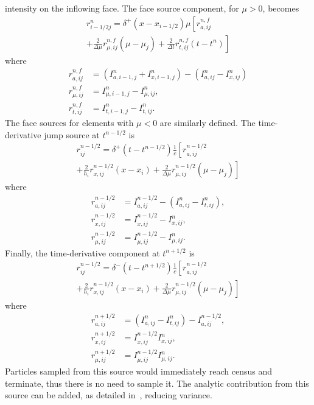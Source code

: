\documentclass{anstrans}
\begin{document}
intensity on the inflowing face.  The face source component, for $\mu>0$, becomes
\begin{multline}
    r_{i-1/2j}^{n} = \delta^+(x-x_{i-1/2}) \mu \left[ r_{a,ij}^{n,f}  \right.
 \\   \left. + \frac{2}{\Delta \mu} r_{\mu,ij}^{n,f} \left(\mu - \mu_j\right) +
    \frac{2}{\Delta t}r_{t,ij}^{n,f}\left(t - t^{n}\right)\right] 
\end{multline}
where
\begin{align}
    r_{a,ij}^{n,f} &= \left(I_{a,i-1,j}^{n} + I_{x,i-1,j}^n\right) - \left(I_{a,ij}^{n} - I_{x,ij}^n\right)       \\ 
    r_{\mu,ij}^{n,f} &= I_{\mu,i-1,j}^{n} - I_{\mu,ij}^n, \\ 
    r_{t,ij}^{n,f} &= I_{t,i-1,j}^{n} - I_{t,ij}^n.
\end{align}
The face sources for elements with $\mu<0$ are similarly defined.  The time-derivative
jump source at $t^{n-1/2}$ is
\begin{multline}
    r_{ij}^{n-1/2} = \delta^+(t-t^{n-1/2})\frac{1}{c}\left[ r_{a,ij}^{n-1/2}  \right. \\ \left. +  \frac{2}{h_i}
    r_{x,ij}^{n-1/2} \left(x - x_i\right) +
    \frac{2}{\Delta \mu}r_{\mu,ij}^{n-1/2}\left(\mu - \mu_j\right)\right] 
\end{multline}
where
\begin{align}
    r_{a,ij}^{n-1/2} &= I_{a,ij}^{n-1/2} - \left(I_{a,ij}^n - I_{t,ij}^n\right), \\
    r_{x,ij}^{n-1/2} &= I_{x,ij}^{n-1/2} - I_{x,ij}^n, \\ 
    r_{\mu,ij}^{n-1/2} &= I_{\mu,ij}^{n-1/2} - I_{\mu,ij}^n.
\end{align}
Finally, the time-derivative component at $t^{n+1/2}$ is
\begin{multline}
    r_{ij}^{n-1/2} = \delta^-(t-t^{n+1/2})\frac{1}{c}\left[ r_{a,ij}^{n-1/2}  \right. \\ \left. +  \frac{2}{h_i}
    r_{x,ij}^{n-1/2} \left(x - x_i\right) +
    \frac{2}{\Delta \mu}r_{\mu,ij}^{n-1/2}\left(\mu - \mu_j\right)\right] 
\end{multline}
where
\begin{align}
    r_{a,ij}^{n+1/2}   &=   \left(I_{a,ij}^n - I_{t,ij}^n\right) -I_{a,ij}^{n-1/2}, \\
    r_{x,ij}^{n+1/2}   &= I_{x,ij}^{n-1/2}   I_{x,ij}^n, \\ 
    r_{\mu,ij}^{n+1/2} &= I_{\mu,ij}^{n-1/2} I_{\mu,ij}^n.
\end{align}
Particles sampled from this source would immediately reach census and terminate, thus there is no
need to sample it.  The analytic contribution from this source can be added, as detailed
in~\cite{dissertation}, reducing variance.
\end{document}
